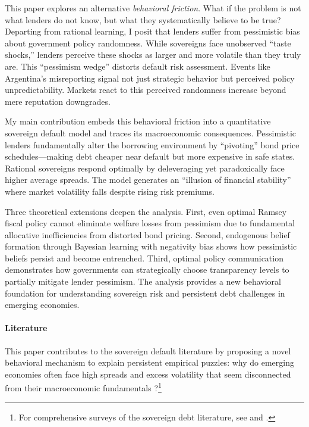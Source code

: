 \documentclass[12pt]{article}
\theoremstyle{plain}
\begin{document}
This paper explores an alternative \textit{behavioral friction}. What if the
problem is not what lenders do not know, but what they systematically believe
to be true? Departing from rational learning, I posit that lenders suffer from
pessimistic bias about government policy randomness. While sovereigns face
unobserved ``taste shocks,'' lenders perceive these shocks as larger and more
volatile than they truly are. This ``pessimism wedge'' distorts default risk
assessment. Events like Argentina's misreporting signal not just strategic
behavior but perceived policy unpredictability. Markets react to this perceived
randomness increase beyond mere reputation downgrades.

My main contribution embeds this behavioral friction into a quantitative
sovereign default model and traces its macroeconomic consequences. Pessimistic
lenders fundamentally alter the borrowing environment by ``pivoting'' bond
price schedules---making debt cheaper near default but more expensive in safe
states. Rational sovereigns respond optimally by deleveraging yet paradoxically
face higher average spreads. The model generates an ``illusion of financial
stability'' where market volatility falls despite rising risk premiums.

Three theoretical extensions deepen the analysis. First, even optimal Ramsey
fiscal policy cannot eliminate welfare losses from pessimism due to fundamental
allocative inefficiencies from distorted bond pricing. Second, endogenous
belief formation through Bayesian learning with negativity bias shows how
pessimistic beliefs persist and become entrenched. Third, optimal policy
communication demonstrates how governments can strategically choose
transparency levels to partially mitigate lender pessimism. The analysis
provides a new behavioral foundation for understanding sovereign risk and
persistent debt challenges in emerging economies.

\paragraph{Literature} This paper contributes to the sovereign default literature by proposing a novel
behavioral mechanism to explain persistent empirical puzzles: why do emerging
economies often face high spreads and excess volatility that seem disconnected
from their macroeconomic fundamentals \citep{TomzWright2013,
	MitchenerTrebesch2023}?\footnote{For comprehensive surveys of the sovereign
	debt literature, see \citep{MeyerReinhartTrebesch2022} and \citep{Abbas2019}.}
\end{document}

